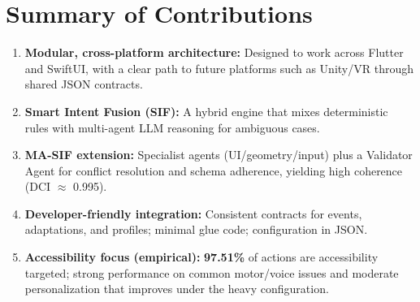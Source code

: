 \section{Summary of Contributions}
\begin{enumerate}
    \item \textbf{Modular, cross-platform architecture:} Designed to work across Flutter and SwiftUI, with a clear path to future platforms such as Unity/VR through shared JSON contracts.
    \item \textbf{Smart Intent Fusion (SIF):} A hybrid engine that mixes deterministic rules with multi-agent LLM reasoning for ambiguous cases.
    \item \textbf{MA-SIF extension:} Specialist agents (UI/geometry/input) plus a Validator Agent for conflict resolution and schema adherence, yielding high coherence (DCI $\approx$ 0.995).
    \item \textbf{Developer-friendly integration:} Consistent contracts for events, adaptations, and profiles; minimal glue code; configuration in JSON.
    \item \textbf{Accessibility focus (empirical):} \textbf{97.51\%} of actions are accessibility targeted; strong performance on common motor/voice issues and moderate personalization that improves under the heavy configuration.
\end{enumerate}


